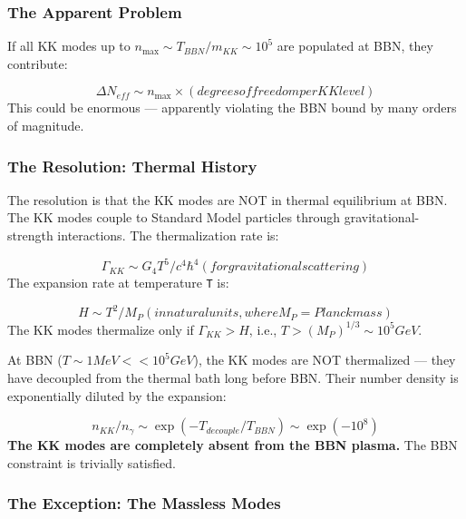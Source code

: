 \documentclass[aps,prd,preprint,superscriptaddress,longbibliography,floatfix]{revtex4-2}
\theoremstyle{remark}
\begin{document}
\subsubsection{The Apparent Problem}

If all KK modes up to $n_{\max} \sim  T_{BBN}/m_{KK} \sim  10^{5}$ are populated at BBN, they contribute:


\begin{equation}
    \Delta N_{eff} \sim  n_{\max} \times (degrees of freedom per KK level)
\end{equation}
This could be enormous --- apparently violating the BBN bound by many orders of magnitude.


\subsubsection{The Resolution: Thermal History}

The resolution is that the KK modes are NOT in thermal equilibrium at BBN. The KK modes couple to Standard Model particles through gravitational- strength interactions. The thermalization rate is:


\begin{equation}
    \Gamma_{KK} \sim  G_{4} T^{5}/c^{4}\hbar^{4} (for gravitational scattering)
\end{equation}
The expansion rate at temperature \texttt{T} is:


\begin{equation}
    H \sim  T^{2}/M_P (in natural units, where M_P = Planck mass)
\end{equation}
The KK modes thermalize only if $\Gamma_{KK} > H$, i.e., $T > (M_P)^{1/3} \sim  10^{5} GeV$.

At BBN ($T \sim  1 MeV << 10^{5} GeV$), the KK modes are NOT thermalized --- they have decoupled from the thermal bath long before BBN. Their number density is exponentially diluted by the expansion:


\begin{equation}
    n_{KK}/n_\gamma \sim  \exp(-T_{decouple}/T_{BBN}) \sim  \exp(-10^{8})
\end{equation}
\textbf{The KK modes are completely absent from the BBN plasma.} The BBN constraint is trivially satisfied.


\subsubsection{The Exception: The Massless Modes}
\end{document}
